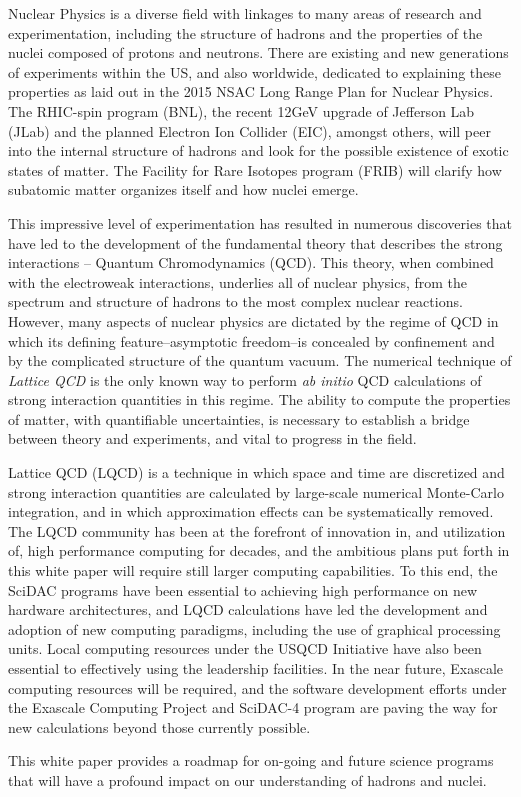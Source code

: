 Nuclear Physics is a diverse field with linkages to many areas of
research and experimentation, including the structure of  hadrons
and the properties of the nuclei composed of protons and neutrons.
There are existing and new generations of experiments within the US,
and also worldwide, dedicated to explaining these properties as laid
out in the 2015 NSAC Long Range Plan for Nuclear Physics.  The
RHIC-spin program (BNL), the recent
12GeV upgrade of Jefferson Lab (JLab) and the planned Electron Ion
Collider (EIC), amongst others, will peer into the internal structure of hadrons and
look for the possible existence of exotic states of matter. The
Facility for Rare Isotopes program (FRIB) will clarify how subatomic
matter organizes itself and how nuclei emerge.

This impressive level of experimentation has resulted in
numerous discoveries that have led to the development of the
fundamental theory that describes the strong interactions -- Quantum
Chromodynamics (QCD). This theory, when combined with the electroweak
interactions, underlies all of nuclear physics, from the spectrum and
structure of hadrons to the most complex nuclear reactions. However,
many aspects of nuclear physics are dictated by the regime of QCD in
which its defining feature--asymptotic freedom--is concealed by
confinement and by the complicated structure of the quantum
vacuum. The numerical technique of {\it Lattice QCD} is the only known
way to perform {\it ab initio} QCD calculations of strong interaction
quantities in this regime. The ability to compute the properties of
matter, with quantifiable uncertainties, is necessary to establish
a bridge between theory and experiments, and vital to progress in the
field.  

Lattice QCD (LQCD) is a technique in which space and time are
discretized and strong interaction quantities are calculated by
large-scale numerical Monte-Carlo integration, and in which
approximation effects can be systematically removed. The LQCD community
has been at the forefront of innovation in, and utilization of, high performance computing  for
decades, and the ambitious plans put forth in this white paper will
require still larger computing capabilities. To this end, the SciDAC
programs have been essential to achieving high performance on new hardware
architectures, and LQCD calculations have led the development and
adoption of new computing paradigms, including the use of graphical
processing units. Local computing resources under the USQCD Initiative
have also been essential to effectively using the
leadership facilities. In the near future, Exascale computing resources
will be required, and the software development efforts under the
Exascale Computing Project and SciDAC-4 program are paving the way for new calculations
beyond those currently possible.


This white paper provides a roadmap for on-going and future science
programs that will have a profound impact on our understanding of hadrons and nuclei.

